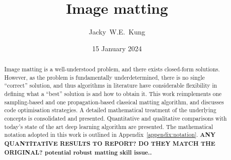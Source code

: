 \documentclass{article}
\title{Image matting}
\author{Jacky~W.E.~Kung}
\date{15 January 2024}
\begin{document}
\doparttoc %
\faketableofcontents %


\maketitle
\begin{abstract}
    Image matting is a well-understood problem, and there exists closed-form solutions. However, as the problem is fundamentally underdetermined, there is no single ``correct'' solution, and thus algorithms in literature have considerable flexibility in defining what a ``best'' solution is and how to obtain it. This work reimplements one sampling-based and one propagation-based classical matting algorithm, and discusses code optimisation strategies. A detailed mathematical treatment of the underlying concepts is consolidated and presented. Quantitative and qualitative comparisons with today's state of the art deep learning algorithm are presented. The mathematical notation adopted in this work is outlined in Appendix~\ref{appendix:notation}.
    \textbf{ ANY QUANTITATIVE RESULTS TO REPORT? DO THEY MATCH THE ORIGINAL?  potential robust matting skill issue.. }
\end{abstract}
\end{document}
